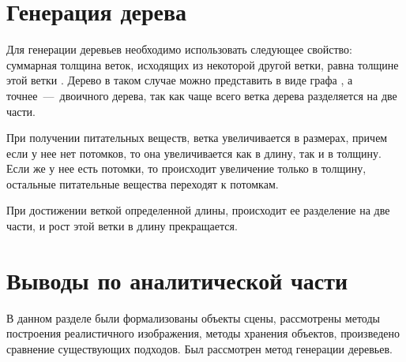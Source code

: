 \section{Генерация дерева}
Для генерации деревьев необходимо использовать следующее свойство: суммарная толщина веток, исходящих из некоторой другой ветки, равна толщине этой ветки \cite{bib:18}. Дерево в таком случае можно представить в виде графа \cite{bib:16}, а точнее~---~двоичного дерева, так как чаще всего ветка дерева разделяется на две части.

При получении питательных веществ, ветка увеличивается в размерах, причем если у нее нет потомков, то она увеличивается как в длину, так и в толщину. Если же у нее есть потомки, то происходит увеличение только в толщину, остальные питательные вещества переходят к потомкам.

При достижении веткой определенной длины, происходит ее разделение на две части, и рост этой ветки в длину прекращается.

\section{Выводы по аналитической части}
В данном разделе были формализованы объекты сцены, рассмотрены методы построения реалистичного изображения, методы хранения объектов, произведено сравнение существующих подходов. Был рассмотрен метод генерации деревьев.

\newpage